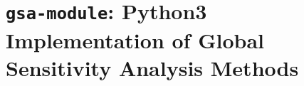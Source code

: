 \section[\texttt{gsa-module}]{\texttt{gsa-module}: Python3 Implementation of Global Sensitivity Analysis Methods}\label{app:gsa_module}
